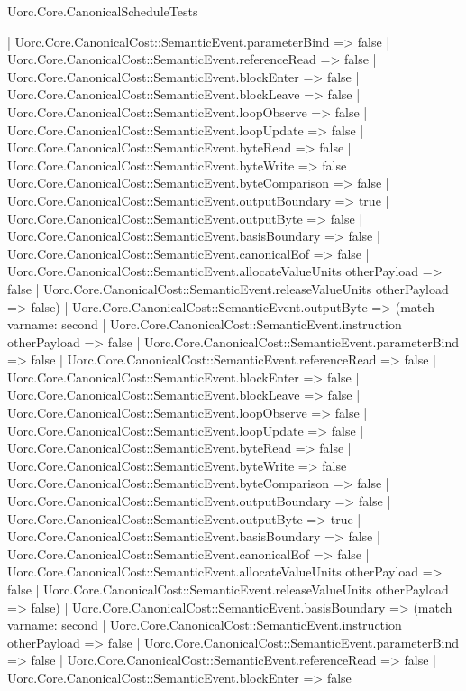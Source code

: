 \begin{lexlean}{Uorc.Core.CanonicalScheduleTests}
\begin{semanticmodule}
{      | Uorc.Core.CanonicalCost::SemanticEvent.parameterBind => false
      | Uorc.Core.CanonicalCost::SemanticEvent.referenceRead => false
      | Uorc.Core.CanonicalCost::SemanticEvent.blockEnter => false
      | Uorc.Core.CanonicalCost::SemanticEvent.blockLeave => false
      | Uorc.Core.CanonicalCost::SemanticEvent.loopObserve => false
      | Uorc.Core.CanonicalCost::SemanticEvent.loopUpdate => false
      | Uorc.Core.CanonicalCost::SemanticEvent.byteRead => false
      | Uorc.Core.CanonicalCost::SemanticEvent.byteWrite => false
      | Uorc.Core.CanonicalCost::SemanticEvent.byteComparison => false
      | Uorc.Core.CanonicalCost::SemanticEvent.outputBoundary => true
      | Uorc.Core.CanonicalCost::SemanticEvent.outputByte => false
      | Uorc.Core.CanonicalCost::SemanticEvent.basisBoundary => false
      | Uorc.Core.CanonicalCost::SemanticEvent.canonicalEof => false
      | Uorc.Core.CanonicalCost::SemanticEvent.allocateValueUnits otherPayload => false
      | Uorc.Core.CanonicalCost::SemanticEvent.releaseValueUnits otherPayload => false)
    | Uorc.Core.CanonicalCost::SemanticEvent.outputByte => (match var{name: second}
      | Uorc.Core.CanonicalCost::SemanticEvent.instruction otherPayload => false
      | Uorc.Core.CanonicalCost::SemanticEvent.parameterBind => false
      | Uorc.Core.CanonicalCost::SemanticEvent.referenceRead => false
      | Uorc.Core.CanonicalCost::SemanticEvent.blockEnter => false
      | Uorc.Core.CanonicalCost::SemanticEvent.blockLeave => false
      | Uorc.Core.CanonicalCost::SemanticEvent.loopObserve => false
      | Uorc.Core.CanonicalCost::SemanticEvent.loopUpdate => false
      | Uorc.Core.CanonicalCost::SemanticEvent.byteRead => false
      | Uorc.Core.CanonicalCost::SemanticEvent.byteWrite => false
      | Uorc.Core.CanonicalCost::SemanticEvent.byteComparison => false
      | Uorc.Core.CanonicalCost::SemanticEvent.outputBoundary => false
      | Uorc.Core.CanonicalCost::SemanticEvent.outputByte => true
      | Uorc.Core.CanonicalCost::SemanticEvent.basisBoundary => false
      | Uorc.Core.CanonicalCost::SemanticEvent.canonicalEof => false
      | Uorc.Core.CanonicalCost::SemanticEvent.allocateValueUnits otherPayload => false
      | Uorc.Core.CanonicalCost::SemanticEvent.releaseValueUnits otherPayload => false)
    | Uorc.Core.CanonicalCost::SemanticEvent.basisBoundary => (match var{name: second}
      | Uorc.Core.CanonicalCost::SemanticEvent.instruction otherPayload => false
      | Uorc.Core.CanonicalCost::SemanticEvent.parameterBind => false
      | Uorc.Core.CanonicalCost::SemanticEvent.referenceRead => false
      | Uorc.Core.CanonicalCost::SemanticEvent.blockEnter => false
}
\end{semanticmodule}
\end{lexlean}
